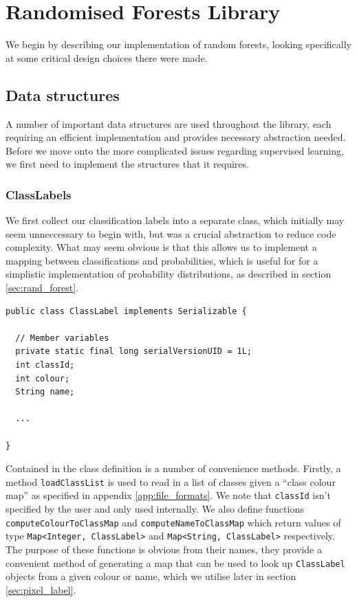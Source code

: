 \documentclass[12pt,twoside,notitlepage]{report}
\begin{document}
    \section{Randomised Forests Library}
        We begin by describing our implementation of random forests, looking specifically at some critical design 
        choices there were made.

        \subsection{Data structures}
            A number of important data structures are used throughout the library, each requiring an efficient 
            implementation and provides necessary abstraction needed. Before we move onto the more complicated issues 
            regarding supervised learning, we first need to implement the structures that it requires.

            \subsubsection{ClassLabels}
                We first collect our classification labels into a separate class, which initially may seem unneccessary 
                to begin with, but was a crucial abstraction to reduce code complexity. What may seem obvious is that 
                this allows us to implement a mapping between classifications and probabilities, which is useful for 
                for a simplistic implementation of probability distributions, as described in section 
                \ref{sec:rand_forest}. 

                \begin{lstlisting}[caption={The \texttt{ClassLabel} class, used to encapsulate a classification label and it's 
                        associated meta-data. Member functions are ommitted.}]
public class ClassLabel implements Serializable {

  // Member variables
  private static final long serialVersionUID = 1L;
  int classId;
  int colour;
  String name;

  ...

}
                \end{lstlisting}

                Contained in the class definition is a number of convenience methods. Firstly, a method 
                \texttt{loadClassList} is used to read in a list of classes given a ``class colour map'' as specified 
                in appendix \ref{app:file_formats}. We note that \texttt{classId} isn't specified by the user and only used 
                internally. We also define functions \texttt{computeColourToClassMap} and \texttt{computeNameToClassMap} 
                which return values of type \texttt{Map<Integer, ClassLabel>} and \texttt{Map<String, ClassLabel>} 
                respectively. The purpose of these functions is obvious from their names, they provide a convenient 
                method of generating a map that can be used to look up \texttt{ClassLabel} objects from a given colour 
                or name, which we utilise later in section \ref{sec:pixel_label}.
\end{document}
